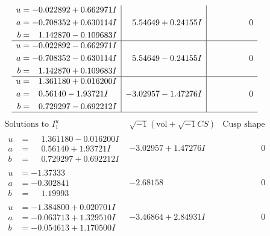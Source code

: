 \documentclass[1p]{elsarticle_modified}
\theoremstyle{definition}
\newcommand{\I}{\sqrt{-1}}
\begin{document}
$$\begin{array}{c|c|c}
\begin{aligned}
u &= -0.022892 + 0.662971 I \\
a &= -0.708352 + 0.630114 I \\
b &= \phantom{-}1.142870 - 0.109683 I\end{aligned}
 & \phantom{-}5.54649 + 0.24155 I & \phantom{-0.000000 } 0 \\ \hline\begin{aligned}
u &= -0.022892 - 0.662971 I \\
a &= -0.708352 - 0.630114 I \\
b &= \phantom{-}1.142870 + 0.109683 I\end{aligned}
 & \phantom{-}5.54649 - 0.24155 I & \phantom{-0.000000 } 0 \\ \hline\begin{aligned}
u &= \phantom{-}1.361180 + 0.016200 I \\
a &= \phantom{-}0.56140 - 1.93721 I \\
b &= \phantom{-}0.729297 - 0.692212 I\end{aligned}
 & -3.02957 - 1.47276 I & \phantom{-0.000000 } 0\\
 \hline 
 \end{array}$$\newpage$$\begin{array}{c|c|c}  
\text{Solutions to }I^u_{1}& \I (\text{vol} + \sqrt{-1}CS) & \text{Cusp shape}\\
 \hline 
\begin{aligned}
u &= \phantom{-}1.361180 - 0.016200 I \\
a &= \phantom{-}0.56140 + 1.93721 I \\
b &= \phantom{-}0.729297 + 0.692212 I\end{aligned}
 & -3.02957 + 1.47276 I & \phantom{-0.000000 } 0 \\ \hline\begin{aligned}
u &= -1.37333\phantom{ +0.000000I} \\
a &= -0.302841\phantom{ +0.000000I} \\
b &= \phantom{-}1.19993\phantom{ +0.000000I}\end{aligned}
 & -2.68158\phantom{ +0.000000I} & \phantom{-0.000000 } 0 \\ \hline\begin{aligned}
u &= -1.384800 + 0.020701 I \\
a &= -0.063713 + 1.329510 I \\
b &= -0.054613 + 1.170500 I\end{aligned}
 & -3.46864 + 2.84931 I & \phantom{-0.000000 } 0 \\ \hline\begin{aligned}

\end{aligned}
\end{array}$$
\end{document}
